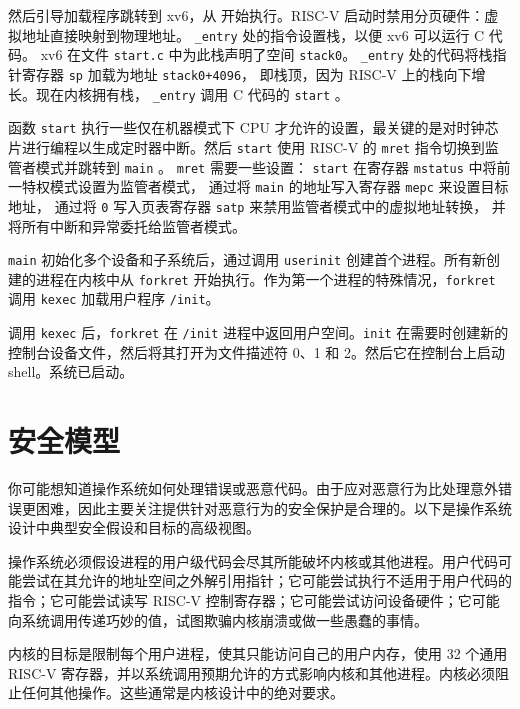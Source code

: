 然后引导加载程序跳转到 xv6，从
开始执行。RISC-V 启动时禁用分页硬件：虚拟地址直接映射到物理地址。
\lstinline{_entry}
处的指令设置栈，以便 xv6 可以运行 C 代码。 xv6 在文件
\lstinline{start.c}
中为此栈声明了空间
\lstinline{stack0}。
\lstinline{_entry}
处的代码将栈指针寄存器
\texttt{sp}
加载为地址
\lstinline{stack0+4096}，
即栈顶，因为 RISC-V 上的栈向下增长。现在内核拥有栈，
\lstinline{_entry}
调用 C 代码的
\lstinline{start}
。

函数
\lstinline{start}
执行一些仅在机器模式下 CPU 才允许的设置，最关键的是对时钟芯片进行编程以生成定时器中断。然后 {\tt start} 使用 RISC-V 的 {\tt mret} 指令切换到监管者模式并跳转到
\lstinline{main}
。
{\tt mret} 需要一些设置：
{\tt start} 在寄存器
\lstinline{mstatus}
中将前一特权模式设置为监管者模式，
通过将
\lstinline{main}
的地址写入寄存器
\lstinline{mepc}
来设置目标地址，
通过将
\lstinline{0}
写入页表寄存器
\lstinline{satp}
来禁用监管者模式中的虚拟地址转换，
并将所有中断和异常委托给监管者模式。

\lstinline{main}  初始化多个设备和子系统后，通过调用 \lstinline{userinit}  创建首个进程。所有新创建的进程在内核中从 \lstinline{forkret}  开始执行。作为第一个进程的特殊情况，{\tt forkret} 调用 {\tt kexec} 加载用户程序 {\tt /init}。

调用 \lstinline{kexec} 后，{\tt forkret} 在 \lstinline{/init} 进程中返回用户空间。\lstinline{init}  在需要时创建新的控制台设备文件，然后将其打开为文件描述符 0、1 和 2。然后它在控制台上启动 shell。系统已启动。

\section{安全模型}

你可能想知道操作系统如何处理错误或恶意代码。由于应对恶意行为比处理意外错误更困难，因此主要关注提供针对恶意行为的安全保护是合理的。以下是操作系统设计中典型安全假设和目标的高级视图。

操作系统必须假设进程的用户级代码会尽其所能破坏内核或其他进程。用户代码可能尝试在其允许的地址空间之外解引用指针；它可能尝试执行不适用于用户代码的指令；它可能尝试读写 RISC-V 控制寄存器；它可能尝试访问设备硬件；它可能向系统调用传递巧妙的值，试图欺骗内核崩溃或做一些愚蠢的事情。

内核的目标是限制每个用户进程，使其只能访问自己的用户内存，使用 32 个通用 RISC-V 寄存器，并以系统调用预期允许的方式影响内核和其他进程。内核必须阻止任何其他操作。这些通常是内核设计中的绝对要求。


